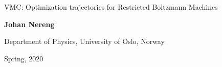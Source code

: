 \documentclass[%
oneside,                 %
final,                   %
10pt]{article}
\begin{document}

\newcommand{\exercisesection}[1]{\subsection*{#1}}






\thispagestyle{empty}

\begin{center}
{\LARGE\bf
\begin{spacing}{1.25}
VMC: Optimization trajectories for Restricted Boltzmann Machines
\end{spacing}
}
\end{center}


\begin{center}
{\bf Johan Nereng}
\end{center}

    \begin{center}
\centerline{{\small Department of Physics, University of Oslo, Norway}}
\end{center}
    

\begin{center}
Spring, 2020
\end{center}
\end{document}
